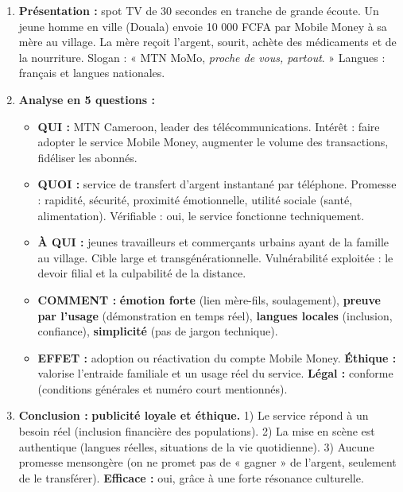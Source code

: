 \documentclass[11pt]{article}
\begin{document}
\begin{corrige}
\begin{enumerate}
    \item \textbf{Présentation :} spot TV de 30 secondes en tranche de grande écoute. Un jeune homme en ville (Douala) envoie 10 000 FCFA par Mobile Money à sa mère au village. La mère reçoit l'argent, sourit, achète des médicaments et de la nourriture. Slogan : « MTN MoMo, \emph{proche de vous, partout}. » Langues : français et langues nationales.
    \item \textbf{Analyse en 5 questions :}
        \begin{itemize}
            \item \textbf{QUI :} MTN Cameroon, leader des télécommunications. Intérêt : faire adopter le service Mobile Money, augmenter le volume des transactions, fidéliser les abonnés.
            \item \textbf{QUOI :} service de transfert d'argent instantané par téléphone. Promesse : rapidité, sécurité, proximité émotionnelle, utilité sociale (santé, alimentation). Vérifiable : oui, le service fonctionne techniquement.
            \item \textbf{À QUI :} jeunes travailleurs et commerçants urbains ayant de la famille au village. Cible large et transgénérationnelle. Vulnérabilité exploitée : le devoir filial et la culpabilité de la distance.
            \item \textbf{COMMENT :} \textbf{émotion forte} (lien mère-fils, soulagement), \textbf{preuve par l'usage} (démonstration en temps réel), \textbf{langues locales} (inclusion, confiance), \textbf{simplicité} (pas de jargon technique).
            \item \textbf{EFFET :} adoption ou réactivation du compte Mobile Money. \textbf{Éthique :} valorise l'entraide familiale et un usage réel du service. \textbf{Légal :} conforme (conditions générales et numéro court mentionnés).
        \end{itemize}
    \item \textbf{Conclusion :} \textbf{publicité loyale et éthique.} 1) Le service répond à un besoin réel (inclusion financière des populations). 2) La mise en scène est authentique (langues réelles, situations de la vie quotidienne). 3) Aucune promesse mensongère (on ne promet pas de « gagner » de l'argent, seulement de le transférer). \textbf{Efficace :} oui, grâce à une forte résonance culturelle.
\end{enumerate}
\end{corrige}
\end{document}
